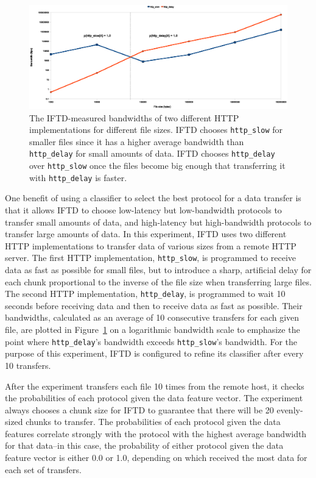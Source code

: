 \begin{figure}[h!]
    \centering
    \includegraphics[width=1.0\textwidth]{diagrams/protocol-classification}
    \caption{The IFTD-measured bandwidths of two different HTTP implementations for different file sizes.  IFTD chooses \texttt{http\_slow} for smaller files since it has a higher average bandwidth than \texttt{http\_delay} for small amounts of data.  IFTD chooses \texttt{http\_delay} over \texttt{http\_slow} once the files become big enough that transferring it with \texttt{http\_delay} is faster.}
    \label{protocol-classification}
\end{figure}

One benefit of using a classifier to select the best protocol for a data transfer is that it allows IFTD to choose low-latency but low-bandwidth protocols to transfer small amounts of data, and high-latency but high-bandwidth protocols to transfer large amounts of data.  In this experiment, IFTD uses two different HTTP implementations to transfer data of various sizes from a remote HTTP server.  The first HTTP implementation, \texttt{http\_slow}, is programmed to receive data as fast as possible for small files, but to introduce a sharp, artificial delay for each chunk proportional to the inverse of the file size when transferring large files.  The second HTTP implementation, \texttt{http\_delay}, is programmed to wait 10 seconds before receiving data and then to receive data as fast as possible.  Their bandwidths, calculated as an average of 10 consecutive transfers for each given file, are plotted in Figure~\ref{protocol-classification} on a logarithmic bandwidth scale to emphasize the point where \texttt{http\_delay}'s bandwidth exceeds \texttt{http\_slow}'s bandwidth.  For the purpose of this experiment, IFTD is configured to refine its classifier after every 10 transfers.

After the experiment transfers each file 10 times from the remote host, it checks the probabilities of each protocol given the data feature vector.  The experiment always chooses a chunk size for IFTD to guarantee that there will be 20 evenly-sized chunks to transfer.  The probabilities of each protocol given the data features correlate strongly with the protocol with the highest average bandwidth for that data--in this case, the probability of either protocol given the data feature vector is either 0.0 or 1.0, depending on which received the most data for each set of transfers.

